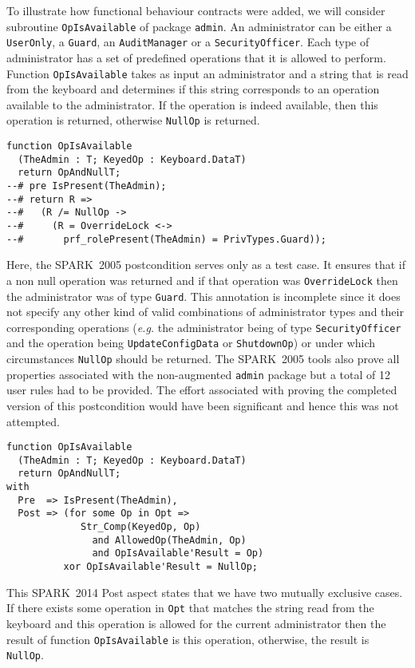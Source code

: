\documentclass[10pt,a4paper,twocolumn]{article}
\newcommand{\oldspark}{SPARK~2005\xspace}
\newcommand{\newspark}{SPARK~2014\xspace}
\newcommand{\eg}{\textit{e.g.}\xspace}
\newcommand{\SPARK}[1]{\lstinline[language=Ada,basicstyle={\footnotesize
      \sffamily},framesep=0pt]$#1$}
\begin{document}
To illustrate how functional behaviour contracts were added, we will
consider subroutine \SPARK{OpIsAvailable} of package \SPARK{admin}. An
administrator can be either a \SPARK{UserOnly}, a \SPARK{Guard}, an
\SPARK{AuditManager} or a \SPARK{SecurityOfficer}. Each type of
administrator has a set of predefined operations that it is allowed to
perform. Function \SPARK{OpIsAvailable} takes as input an
administrator and a string that is read from the keyboard and
determines if this string corresponds to an operation available to the
administrator. If the operation is indeed available, then this
operation is returned, otherwise \SPARK{NullOp} is returned.

\begin{lstlisting}
function OpIsAvailable
  (TheAdmin : T; KeyedOp : Keyboard.DataT)
  return OpAndNullT;
--# pre IsPresent(TheAdmin);
--# return R =>
--#   (R /= NullOp ->
--#     (R = OverrideLock <->
--#       prf_rolePresent(TheAdmin) = PrivTypes.Guard));
\end{lstlisting}
Here, the \oldspark postcondition serves only as a test case. It
ensures that if a non null operation was returned and if that
operation was \SPARK{OverrideLock} then the administrator was of type
\SPARK{Guard}. This annotation is incomplete since it does not specify
any other kind of valid combinations of administrator types and their
corresponding operations (\eg the administrator being of type
\SPARK{SecurityOfficer} and the operation being
\SPARK{UpdateConfigData} or \SPARK{ShutdownOp}) or under which
circumstances \SPARK{NullOp} should be returned.
The \oldspark tools also prove all properties associated with
the non-augmented \SPARK{admin} package but a total of 12 user rules had
to be provided. The
effort associated with proving the completed version of this
postcondition would have been significant and hence this was not attempted.

\begin{lstlisting}
function OpIsAvailable
  (TheAdmin : T; KeyedOp : Keyboard.DataT)
  return OpAndNullT;
with
  Pre  => IsPresent(TheAdmin),
  Post => (for some Op in Opt =>
             Str_Comp(KeyedOp, Op)
               and AllowedOp(TheAdmin, Op)
               and OpIsAvailable'Result = Op)
          xor OpIsAvailable'Result = NullOp;
\end{lstlisting}
This \newspark Post aspect states that we have two mutually
exclusive cases. If there exists some operation in \SPARK{Opt} that
matches the string read from the keyboard and this operation is
allowed for the current administrator then the result of function
\SPARK{OpIsAvailable} is this operation, otherwise, the result is
\SPARK{NullOp}.
\end{document}
